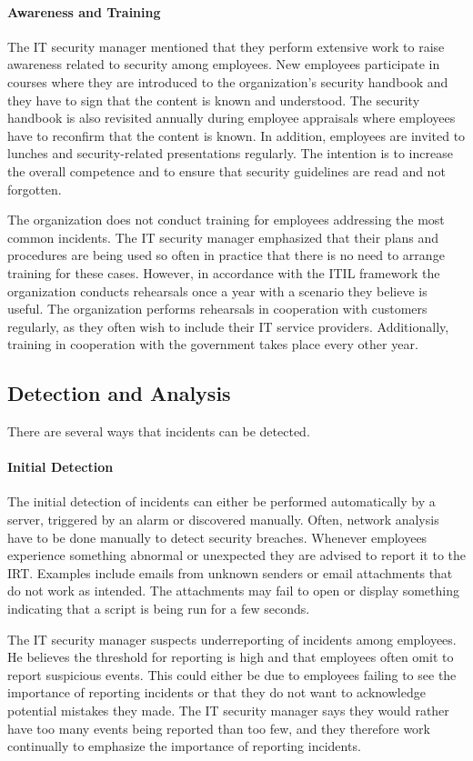 \paragraph{Awareness and Training}
The IT security manager mentioned that they perform extensive work to raise awareness related to security among employees. New employees participate in courses where they are introduced to the organization's security handbook and they have to sign that the content is known and understood. The security handbook is also revisited annually during employee appraisals where employees have to reconfirm that the content is known. In addition, employees are invited to lunches and security-related presentations regularly. The intention is to increase the overall competence and to ensure that security guidelines are read and not forgotten.

The organization does not conduct training for employees addressing the most common incidents. The IT security manager emphasized that their plans and procedures are being used so often in practice that there is no need to arrange training for these cases. However, in accordance with the ITIL framework the organization conducts rehearsals once a year with a scenario they believe is useful. The organization performs rehearsals in cooperation with customers regularly, as they often wish to include their IT service providers. Additionally, training in cooperation with the government takes place every other year. 

\subsection{Detection and Analysis}
There are several ways that incidents can be detected.
\paragraph{Initial Detection}
The initial detection of incidents can either be performed automatically by a server, triggered by an alarm or discovered manually. Often, network analysis have to be done manually to detect security breaches. Whenever employees experience something abnormal or unexpected they are advised to report it to the \ac{IRT}. Examples include emails from unknown senders or email attachments that do not work as intended. The attachments may fail to open or display something indicating that a script is being run for a few seconds.

The IT security manager suspects underreporting of incidents among employees. He believes the threshold for reporting is high and that employees often omit to report suspicious events. This could either be due to employees failing to see the importance of reporting incidents or that they do not want to acknowledge potential mistakes they made. The IT security manager says they would rather have too many events being reported than too few, and they therefore work continually to emphasize the importance of reporting incidents.

